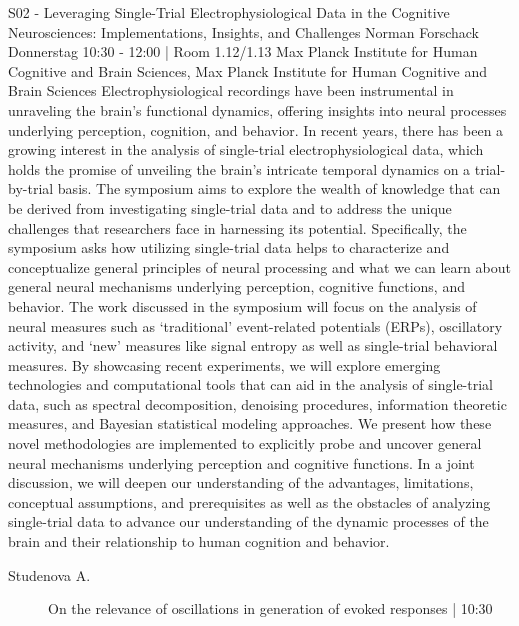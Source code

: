 
            \begin{symposium}
            {S02 - Leveraging Single-Trial Electrophysiological Data in the Cognitive Neurosciences: Implementations, Insights, and Challenges}
            {Norman Forschack}
            {Donnerstag 10:30 - 12:00 | Room 1.12/1.13}
            {Max Planck Institute for Human Cognitive and Brain Sciences, Max Planck Institute for Human Cognitive and Brain Sciences}
            Electrophysiological recordings have been instrumental in unraveling the brain's functional dynamics, offering insights into neural processes underlying perception, cognition, and behavior. In recent years, there has been a growing interest in the analysis of single-trial electrophysiological data, which holds the promise of unveiling the brain's intricate temporal dynamics on a trial-by-trial basis. The symposium aims to explore the wealth of knowledge that can be derived from investigating single-trial data and to address the unique challenges that researchers face in harnessing its potential.
Specifically, the symposium asks how utilizing single-trial data helps to characterize and conceptualize general principles of neural processing and what we can learn about general neural mechanisms underlying perception, cognitive functions, and behavior. The work discussed in the symposium will focus on the analysis of neural measures such as ‘traditional’ event-related potentials (ERPs), oscillatory activity, and ‘new’ measures like signal entropy as well as single-trial behavioral measures. By showcasing recent experiments, we will explore emerging technologies and computational tools that can aid in the analysis of single-trial data, such as spectral decomposition, denoising procedures, information theoretic measures, and Bayesian statistical modeling approaches. We present how these novel methodologies are implemented to explicitly probe and uncover general neural mechanisms underlying perception and cognitive functions. In a joint discussion, we will deepen our understanding of the advantages, limitations, conceptual assumptions, and prerequisites as well as the obstacles of analyzing single-trial data to advance our understanding of the dynamic processes of the brain and their relationship to human cognition and behavior.
            \begin{description}    
            
                \item [ Studenova A.] On the relevance of oscillations in generation of evoked responses \textcolor{mygray}{ | 10:30}    
                

\end{description}
\end{symposium}
